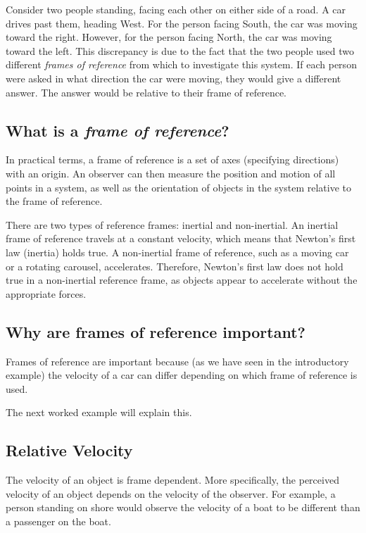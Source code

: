 Consider two people standing, facing each other on either side of a road. A car drives past them, heading West. For the person facing South, the car was moving toward the right. However, for the person facing North, the car was moving toward the left. This discrepancy is due to the fact that the two people used two different \textit{frames of reference} from which to investigate this system. If each person were asked in what direction the car were moving, they would give a different answer. The answer would be relative to their frame of reference.

\subsection{What is a \textit{frame of reference}?}
 In practical terms, a frame of reference is a set of axes (specifying directions) with an origin. An observer can then measure the position and motion of all points in a system, as well as the orientation of objects in the system relative to the frame of reference.

There are two types of reference frames: inertial and non-inertial. An inertial frame of reference travels at a constant velocity, which means that Newton's first law (inertia) holds true. A non-inertial frame of reference, such as a moving car or a rotating carousel, accelerates. Therefore, Newton's first law does not hold true in a non-inertial reference frame, as objects appear to accelerate without the appropriate forces.

\subsection{Why are frames of reference important?}
Frames of reference are important because (as we have seen in the introductory example) the velocity of a car can differ depending on which frame of reference is used.

The next worked example will explain this.
\subsection{Relative Velocity}
The velocity of an object is frame dependent. More specifically, the perceived velocity of an object depends on the velocity of the observer. For example, a person standing on shore would observe the velocity of a boat to be different than a passenger on the boat. 

